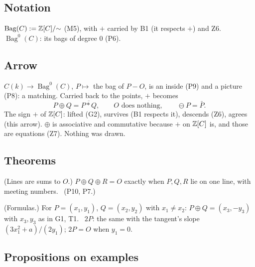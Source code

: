 \subsection*{Notation}

\begin{lines}
\item[\lab{N1}] $\operatorname{Bag}(C) := \mathbb{Z}[C]/{\sim}$ (M5), with $+$ carried by B1 (it respects $+$) and Z6. \ $\operatorname{Bag}^0(C)$: its bags of degree $0$ (P6).
\end{lines}

\subsection*{Arrow}

\begin{lines}
\item[\lab{P10}] $C(k) \to \operatorname{Bag}^0(C)$, $P \mapsto$ the bag of $P - O$, is an inside (P9) and a picture (P8): a matching. Carried back to the points, $+$ becomes \[ P \oplus Q = \overline{P * Q}, \qquad O \text{ does nothing}, \qquad \ominus P = \bar P . \] The sign $+$ of $\mathbb{Z}[C]$: lifted (G2), survives (B1 respects it), descends (Z6), agrees (this arrow). $\oplus$ is associative and commutative because $+$ on $\mathbb{Z}[C]$ is, and those are equations (Z7). Nothing was drawn.
\end{lines}

\subsection*{Theorems}

\begin{lines}
\item[\lab{T1}] (Lines are sums to $O$.) $P \oplus Q \oplus R = O$ exactly when $P, Q, R$ lie on one line, with meeting numbers. \ (P10, P7.)
\item[\lab{T2}] (Formulas.) For $P = (x_1, y_1)$, $Q = (x_2, y_2)$ with $x_1 \ne x_2$: $P \oplus Q = (x_3, -y_3)$ with $x_3, y_3$ as in G1, T1. \ $2P$: the same with the tangent's slope $(3x_1^2 + a)/(2y_1)$; $2P = O$ when $y_1 = 0$.
\end{lines}

\subsection*{Propositions on examples}

